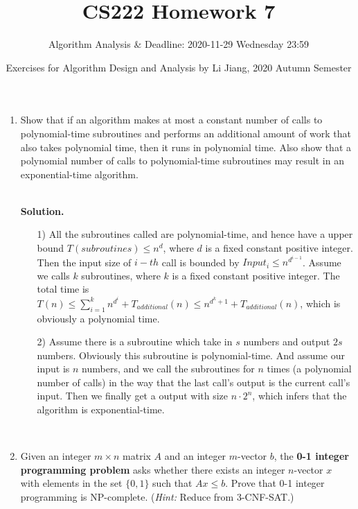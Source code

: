 \documentclass{article}
\title{CS222 Homework 7}
\author{Algorithm Analysis \& Deadline: 2020-11-29 Wednesday 23:59}
\date{Exercises for Algorithm Design and Analysis by Li Jiang, 2020 Autumn Semester}
\newtheorem*{solution}{Solution}
\begin{document}
\maketitle

\begin{enumerate}
    \item
    Show that if an algorithm makes at most a constant number of calls to polynomial-time subroutines and performs an additional amount of work that also takes polynomial time, then it runs in polynomial time. Also show that a polynomial number of calls to polynomial-time subroutines may result in an exponential-time algorithm.

~\\
\textbf{Solution.}\\
\begin{itemize}
    \item [1)] All the subroutines called are polynomial-time, and hence have a upper bound $T(subroutines) \leq n^d$, where $d$ is a fixed constant positive integer. Then the input size of $i-th$ call is bounded by $Input_i \leq n^{d^{i-1}}$. Assume we calls $k$ subroutines, where $k$ is a fixed constant positive integer. The total time is $T(n)\leq \sum_{i=1}^k n^{d^i} + T_{additional}(n) \leq n^{d^k+1} + T_{additional}(n)$, which is obviously a polynomial time.
    \item [2)] Assume there is a subroutine which take in $s$ numbers and output $2s$ numbers. Obviously this subroutine is polynomial-time. And assume our input is $n$ numbers, and we call the subroutines for $n$ times (a polynomial number of calls) in the way that the last call's output is the current call's input. Then we finally get a output with size $n\cdot 2^n$, which infers that the algorithm is exponential-time.  
\end{itemize}
~\\   
    \item
    Given an integer $m \times n$ matrix $A$ and an integer $m$-vector $b$, the \textbf{0-1 integer programming problem} asks whether there exists an integer $n$-vector $x$ with elements in the set $\{0, 1\}$ such that $Ax \le b$. Prove that 0-1 integer programming is NP-complete. (\textit{Hint:} Reduce from 3-CNF-SAT.)


\end{enumerate}
\end{document}
